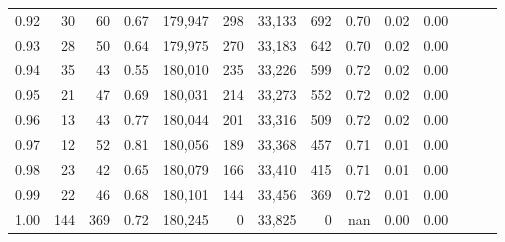 \begin{tabular}{rrrrrrrrrrrrrr}
0.92 &     30 &   60 &  0.67 &  179,947 &      298 &  33,133 &     692 &  0.70 &  0.02 &      0.00 \\
0.93 &     28 &   50 &  0.64 &  179,975 &      270 &  33,183 &     642 &  0.70 &  0.02 &      0.00 \\
0.94 &     35 &   43 &  0.55 &  180,010 &      235 &  33,226 &     599 &  0.72 &  0.02 &      0.00 \\
0.95 &     21 &   47 &  0.69 &  180,031 &      214 &  33,273 &     552 &  0.72 &  0.02 &      0.00 \\
0.96 &     13 &   43 &  0.77 &  180,044 &      201 &  33,316 &     509 &  0.72 &  0.02 &      0.00 \\
0.97 &     12 &   52 &  0.81 &  180,056 &      189 &  33,368 &     457 &  0.71 &  0.01 &      0.00 \\
0.98 &     23 &   42 &  0.65 &  180,079 &      166 &  33,410 &     415 &  0.71 &  0.01 &      0.00 \\
0.99 &     22 &   46 &  0.68 &  180,101 &      144 &  33,456 &     369 &  0.72 &  0.01 &      0.00 \\
1.00 &    144 &  369 &  0.72 &  180,245 &        0 &  33,825 &       0 &   nan &  0.00 &      0.00 \\
\bottomrule
\end{tabular}
